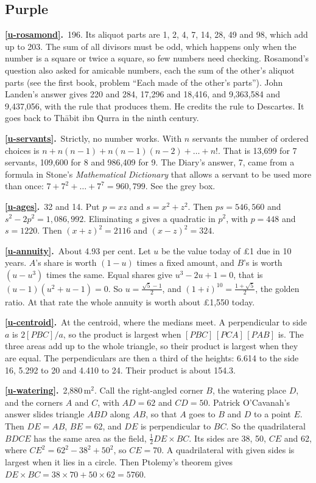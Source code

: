 \documentclass[11pt,a4paper]{article}
\newcounter{prob}
\newcommand{\ans}[2]{\par\smallskip\noindent\textbf{\ref{#1}.}\ #2}
\begin{document}
\subsection*{\color{bandpurple}Purple}
\ans{u-rosamond}{196. Its aliquot parts are 1, 2, 4, 7, 14, 28, 49 and 98, which add up
to 203. The sum of all divisors must be odd, which happens only when the number is a
square or twice a square, so few numbers need checking. Rosamond's question also asked
for amicable numbers, each the sum of the other's aliquot parts (see the first book,
problem ``Each made of the other's parts''). John Landen's answer gives 220 and 284,
17,296 and 18,416, and 9,363,584 and 9,437,056, with the rule that produces them. He
credits the rule to Descartes. It goes back to Th\=abit ibn Qurra in the ninth
century.}
\ans{u-servants}{Strictly, no number works. With $n$ servants the number of ordered
choices is $n + n(n-1) + n(n-1)(n-2) + \dots + n!$. That is 13,699 for 7 servants,
109,600 for 8 and 986,409 for 9. The Diary's answer, 7, came from a formula in Stone's
\textit{Mathematical Dictionary} that allows a servant to be used more than once:
$7 + 7^2 + \dots + 7^7 = 960{,}799$. See the grey box.}
\ans{u-ages}{32 and 14. Put $p = xz$ and $s = x^2 + z^2$. Then $ps = 546{,}560$ and
$s^2 - 2p^2 = 1{,}086{,}992$. Eliminating $s$ gives a quadratic in $p^2$, with
$p = 448$ and $s = 1220$. Then $(x+z)^2 = 2116$ and $(x-z)^2 = 324$.}
\ans{u-annuity}{About 4.93 per cent. Let $u$ be the value today of \pounds1 due in 10 years.
$A$'s share is worth $(1 - u)$ times a fixed amount, and $B$'s is worth $(u - u^3)$ times
the same. Equal shares give $u^3 - 2u + 1 = 0$, that is $(u - 1)(u^2 + u - 1) = 0$. So
$u = \tfrac{\sqrt5 - 1}{2}$, and $(1 + i)^{10} = \tfrac{1+\sqrt5}{2}$, the golden ratio.
At that rate the whole annuity is worth about \pounds1,550 today.}
\ans{u-centroid}{At the centroid, where the medians meet. A perpendicular to side $a$
is $2[PBC]/a$, so the product is largest when $[PBC]\,[PCA]\,[PAB]$ is. The three areas
add up to the whole triangle, so their product is largest when they are equal. The
perpendiculars are then a third of the heights: 6.614 to the side 16, 5.292 to 20 and
4.410 to 24. Their product is about 154.3.}
\ans{u-watering}{2,880\,m$^2$. Call the right-angled corner $B$, the watering place $D$, and
the corners $A$ and $C$, with $AD = 62$ and $CD = 50$. Patrick O'Cavanah's answer slides
triangle $ABD$ along $AB$, so that $A$ goes to $B$ and $D$ to a point $E$. Then
$DE = AB$, $BE = 62$, and $DE$ is perpendicular to $BC$. So the quadrilateral $BDCE$ has
the same area as the field, $\tfrac12 DE\times BC$. Its sides are 38, 50, $CE$ and 62,
where $CE^2 = 62^2 - 38^2 + 50^2$, so $CE = 70$. A quadrilateral with given sides is
largest when it lies in a circle. Then Ptolemy's theorem gives
$DE\times BC = 38\times70 + 50\times62 = 5760$.}
\end{document}
